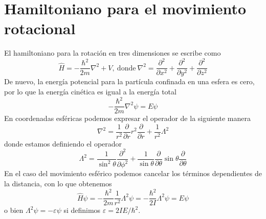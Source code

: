 \section{Hamiltoniano para el movimiento rotacional}
El hamiltoniano para la rotación en tres
dimensiones se escribe como
\begin{equation}
    \hat{H}=-\frac{\hbar^2}{2m}\nabla^2 +V,
    \mathrm{~ donde~}
    \nabla^2=\frac{\partial^2}{\partial x^2} + \frac{\partial^2}{\partial y^2} +\frac{\partial^2}{\partial z^2}
\end{equation}
De nuevo, la energía potencial para la partícula confinada
en una esfera es cero, por lo que la energía cinética es
igual a la energía total
\begin{equation}
    -\frac{\hbar^2}{2m}\nabla^2\psi=E\psi
\end{equation}
En coordenadas esféricas podemos expresar el operador
de la siguiente manera
\begin{equation}
    \nabla^2=\frac{1}{r^2}\frac{\partial}{\partial r}r^2\frac{\partial}{\partial r} + \frac{1}{r^2}\Lambda^2
\end{equation}
donde estamos definiendo el operador
\begin{equation}
    \Lambda^2=\frac{1}{\sin^2\theta}\frac{\partial^2}{\partial\phi^2}+
    \frac{1}{\sin\theta}\frac{\partial}{\partial\theta}\sin\theta\frac{\partial}{\partial\theta}
\end{equation}
En el caso del movimiento esférico podemos cancelar los 
términos dependientes de la distancia, con lo que obtenemos
\begin{equation}
\hat{H}\psi=-\frac{\hbar^2}{2m}\frac{1}{r^2}\Lambda^2\psi=-\frac{\hbar^2}{2I}\Lambda^2\psi=E\psi
\label{eq:rothamiltonian}
\end{equation}
o bien $\Lambda^2\psi=-\varepsilon\psi$ si definimos 
$\varepsilon=2IE/\hbar^2$.

